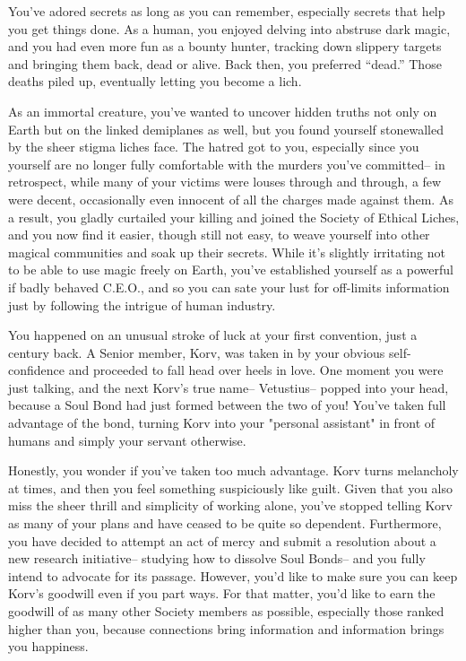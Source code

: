 \documentclass[char]{Sel}
\begin{document}
\name{\cLock{}}
You've adored secrets as long as you can remember, especially secrets that help you get things done. As a human, you enjoyed delving into abstruse dark magic, and you had even more fun as a bounty hunter, tracking down slippery targets and bringing them back, dead or alive. Back then, you preferred ``dead.'' Those deaths piled up, eventually letting you become a lich.

As an immortal creature, you've wanted to uncover hidden truths not only on Earth but on the linked demiplanes as well, but you found yourself stonewalled by the sheer stigma liches face. The hatred got to you, especially since you yourself are no longer fully comfortable with the murders you've committed-- in retrospect, while many of your victims were louses through and through, a few were decent, occasionally even innocent of all the charges made against them. As a result, you gladly curtailed your killing and joined the Society of Ethical Liches, and you now find it easier, though still not easy, to weave yourself into other magical communities and soak up their secrets. While it's slightly irritating not to be able to use magic freely on Earth, you've established yourself as a powerful if badly behaved C.E.O., and so you can sate your lust for off-limits information just by following the intrigue of human industry.

You happened on an unusual stroke of luck at your first convention, just a century back. A Senior member, Korv, was taken in by your obvious self-confidence and proceeded to fall head over heels in love. One moment you were just talking, and the next Korv’s true name-- Vetustius-- popped into your head, because a Soul Bond had just formed between the two of you! You've taken full advantage of the bond, turning Korv into your "personal assistant" in front of humans and simply your servant otherwise.

Honestly, you wonder if you've taken too much advantage. Korv turns melancholy at times, and then you feel something suspiciously like guilt. Given that you also miss the sheer thrill and simplicity of working alone, you've stopped telling Korv as many of your plans and have ceased to be quite so dependent. Furthermore, you have decided to attempt an act of mercy and submit a resolution about a new research initiative-- studying how to dissolve Soul Bonds-- and you fully intend to advocate for its passage. However, you'd like to make sure you can keep Korv's goodwill even if you part ways. For that matter, you'd like to earn the goodwill of as many other Society members as possible, especially those ranked higher than you, because connections bring information and information brings you happiness.
\end{document}
